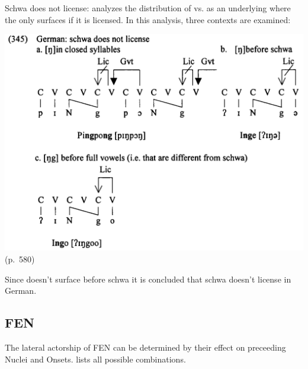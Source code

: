 Schwa does not license: \cite{scheer2004} analyzes the distribution
of \textipa{[N]} vs. \textipa{[Ng]} as an underlying 
where the  only surfaces if it is licensed.
In this analysis, three contexts are examined:

\includegraphics[width=.7\textwidth]{figures/ng-three-contexts.png}
(p.~580)

Since  doesn't surface before schwa it is concluded
that schwa doesn't license in German.


\subsection{FEN}
The lateral actorship of FEN can be determined by their effect
on preceeding Nuclei and Onsets.  lists
all possible combinations.

